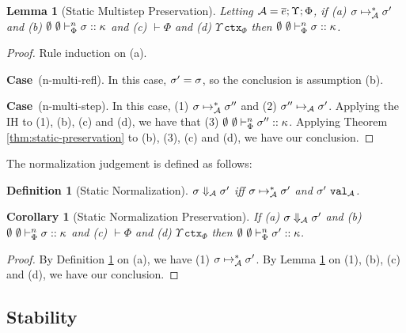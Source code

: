 \documentclass[12pt]{article}
\newtheorem{lemma}{Lemma}
\newtheorem{corollary}{Corollary}
\newtheorem{definition}{Definition}
\newcommand{\pfcase}[1]{\textbf{Case}~#1. }
\begin{document}
\begin{lemma}[Static Multistep Preservation]
\label{lemma:static-multistep-preservation}
Letting $\mathcal{A}=\overline{e}; \Upsilon; \Phi$, if (a) $\sigma \mapsto_{\mathcal{A}}^{*} \sigma'$ and (b) $\emptyset~\emptyset \vdash_{\Phi}^{n} \sigma :: \kappa$ and (c) $\vdash \Phi$ and (d) $\Upsilon~\mathtt{ctx}_\Phi$ then $\emptyset~\emptyset \vdash_{\Phi}^{n} \sigma :: \kappa$.
\end{lemma}
\begin{proof} Rule induction on (a). 

\pfcase{(n-multi-refl)} In this case, $\sigma'=\sigma$, so the conclusion is assumption (b).

\pfcase{(n-multi-step)} In this case, (1) $\sigma \mapsto_{\mathcal{A}}^{*} \sigma''$ and (2) $\sigma'' \mapsto_{\mathcal{A}} \sigma'$. Applying the IH to (1), (b), (c) and (d), we have that (3) $\emptyset~\emptyset \vdash_{\Phi}^{n} \sigma'' :: \kappa$. Applying Theorem \ref{thm:static-preservation} to (b), (3), (c) and (d), we have our conclusion.
\end{proof}

The normalization judgement is defined as follows:

\begin{definition}[Static Normalization]
\label{definition:static-normalization}
$\sigma \Downarrow_{\mathcal{A}} \sigma'$ iff $\sigma \mapsto_{\mathcal{A}}^{*} \sigma'$ and $\sigma'~\mathtt{val}_{\mathcal{A}}$.
\end{definition}

\begin{corollary}[Static Normalization Preservation]
\label{lemma:static-normalization-preservation}
If (a) $\sigma \Downarrow_{\mathcal{A}} \sigma'$ and (b) $\emptyset~\emptyset \vdash_{\Phi}^{n} \sigma :: \kappa$ and (c) $\vdash \Phi$ and (d) $\Upsilon~\mathtt{ctx}_\Phi$ then $\emptyset~\emptyset \vdash_{\Phi}^{n} \sigma' :: \kappa$.
\end{corollary}
\begin{proof} By Definition \ref{definition:static-normalization} on (a), we have (1) $\sigma \mapsto_{\mathcal{A}}^{*} \sigma'$. By Lemma \ref{lemma:static-multistep-preservation} on (1), (b), (c) and (d), we have our conclusion.
\end{proof}

\subsection{Stability}
\end{document}

